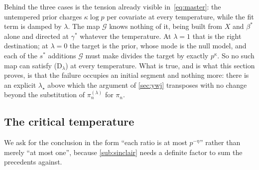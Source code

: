 \documentclass[aos]{imsart}
\theoremstyle{plain}
\theoremstyle{definition}
\begin{document}
    Behind the three cases is the tension already visible
    in~\eqref{eq:master}: the untempered prior charges $\kappa\log p$ per
    covariate at every temperature, while the fit term is damped by
    $\lambda$. The map $\mathcal{G}$ knows nothing of it, being built from
    $X$ and $\beta^{\ast}$ alone and directed at $\gamma^{\ast}$ whatever
    the temperature. At $\lambda=1$ that is the right destination; at
    $\lambda=0$ the target is the prior, whose mode is the null model, and
    each of the $s^{\ast}$ additions $\mathcal{G}$ must make divides the
    target by exactly $p^{\kappa}$. So no such map can satisfy
    (D$_\lambda$) at every temperature. What is true, and is what this
    section proves, is that the failure occupies an initial segment and
    nothing more: there is an explicit $\lambda_\star$ above which the
    argument of \cref{sec:ywj} transposes with no change beyond the
    substitution of $\pi_n^{(\lambda)}$ for $\pi_n$.

    \subsection{The critical temperature}
    \label{sub:critical}

    We ask for the conclusion in the form ``each ratio is at most
    $p^{-\eta}$'' rather than merely ``at most one'', because
    \cref{sub:sinclair} needs a definite factor to sum the precedents
    against.
\end{document}
